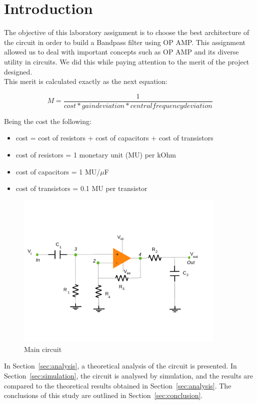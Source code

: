 \newpage
\section{Introduction}
\label{sec:introduction}

The objective of this laboratory assignment is to choose the best architecture of the circuit in order to build a Bandpass filter using OP AMP. This assignment allowed us to deal with important concepts such as OP AMP and its diverse utility in circuits. We did this while paying attention to the merit of the project designed.\\
This merit is calculated exactly as the next equation:

\begin{equation} 
M = \frac{1}{cost * gain deviation * central frequency deviation}
\label{eq1}
\end{equation}

Being the cost the following:
\begin{itemize}
	\item cost = cost of resistors  + cost of capacitors + cost of transistors
	\item cost of resistors = 1 monetary unit (MU) per kOhm
	\item cost of capacitors = 1 MU/$\mu$F
	\item cost of transistors = 0.1 MU per transistor
	
\end{itemize}

\begin{figure}[H] 
\centering
\includegraphics[width= 10cm]{circuito5.pdf} 
\caption{Main circuit}
\label{first}
\end{figure}

In Section~\ref{sec:analysis}, a theoretical analysis of the circuit is
presented. In Section~\ref{sec:simulation}, the circuit is analysed by
simulation, and the results are compared to the theoretical results obtained in
Section~\ref{sec:analysis}. The conclusions of this study are outlined in
Section~\ref{sec:conclusion}. \\


